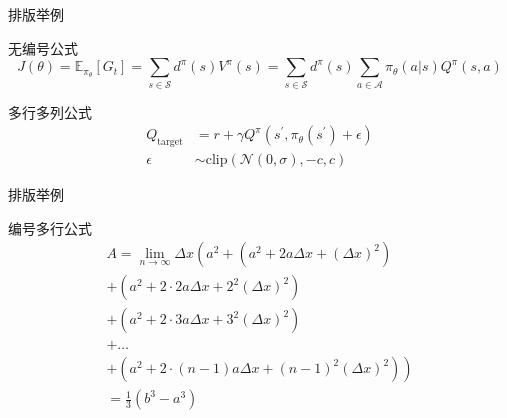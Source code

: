 \documentclass{beamer}
\begin{document}
\begin{frame}{排版举例}
    \begin{exampleblock}{无编号公式} %
        \begin{equation*}
            J(\theta) = \mathbb{E}_{\pi_\theta}[G_t] = \sum_{s\in\mathcal{S}} d^\pi (s)V^\pi(s)=\sum_{s\in\mathcal{S}} d^\pi(s)\sum_{a\in\mathcal{A}}\pi_\theta(a|s)Q^\pi(s,a)
        \end{equation*}
    \end{exampleblock}
    \begin{exampleblock}{多行多列公式\footnotemark[1]}
        \begin{align}
            Q_\mathrm{target}&=r+\gamma Q^\pi(s^\prime, \pi_\theta(s^\prime)+\epsilon)\\
            \epsilon&\sim\mathrm{clip}(\mathcal{N}(0, \sigma), -c, c)\nonumber
        \end{align}
    \end{exampleblock}
\end{frame}

\begin{frame}{排版举例}
    \begin{exampleblock}{编号多行公式}
        \begin{multline}
            A=\lim_{n\rightarrow\infty}\Delta x\left(a^{2}+\left(a^{2}+2a\Delta x+\left(\Delta x\right)^{2}\right)\right.\label{eq:reset}\\
            +\left(a^{2}+2\cdot2a\Delta x+2^{2}\left(\Delta x\right)^{2}\right)\\
            +\left(a^{2}+2\cdot3a\Delta x+3^{2}\left(\Delta x\right)^{2}\right)\\
            +\ldots\\
            \left.+\left(a^{2}+2\cdot(n-1)a\Delta x+(n-1)^{2}\left(\Delta x\right)^{2}\right)\right)\\
            =\frac{1}{3}\left(b^{3}-a^{3}\right)
        \end{multline}
    \end{exampleblock}
\end{frame}
\end{document}
